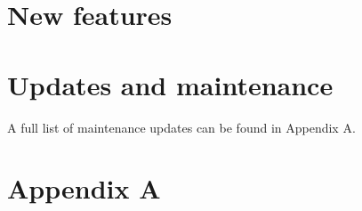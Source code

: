 \documentclass[letterpaper,10pt,english]{sphinxmanual}
\begin{document}
\chapter{New features}
\label{\detokenize{TN202403:new-features}}

\chapter{Updates and maintenance}
\label{\detokenize{TN202403:updates-and-maintenance}}
\sphinxAtStartPar
A full list of maintenance updates can be found in Appendix A.

\newpage


\chapter{Appendix A}
\label{\detokenize{TN202403:appendix-a}}


\renewcommand{\indexname}{Index}
\printindex
\end{document}
